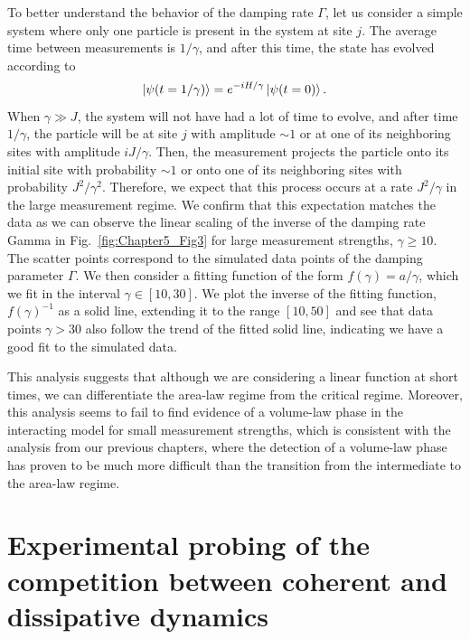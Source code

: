 To better understand the behavior of the damping rate $\Gamma$, let us consider a simple system where only one particle is present in the system at site $j$. The average time between measurements is $1/\gamma$, and after this time, the state has evolved according to 
\begin{equation}
    \ket{\psi(t = 1/\gamma)} = e^{-i H / \gamma} \ket{\psi(t=0)}.
\end{equation}
When $\gamma \gg J$, the system will not have had a lot of time to evolve, and after time $1/\gamma$, the particle will be at site $j$ with amplitude $\sim 1$ or at one of its neighboring sites with amplitude $i J/\gamma$. Then, the measurement projects the particle onto its initial site with probability $\sim 1$ or onto one of its neighboring sites with probability $J^2/\gamma^2$. Therefore, we expect that this process occurs at a rate $J^2 / \gamma$ in the large measurement regime. We confirm that this expectation matches the data as we can observe the linear scaling of the inverse of the damping rate Gamma in Fig.~\ref{fig:Chapter5_Fig3} for large measurement strengths, $\gamma \geq 10$. The scatter points correspond to the simulated data points of the damping parameter $\Gamma$. We then consider a fitting function of the form $f(\gamma) = a/\gamma$, which we fit in the interval $\gamma \in [10, 30]$. We plot the inverse of the fitting function, $f(\gamma)^{-1}$ as a solid line, extending it to the range $[10, 50]$ and see that data points $\gamma > 30$ also follow the trend of the fitted solid line, indicating we have a good fit to the simulated data. 

This analysis suggests that although we are considering a linear function at short times, we can differentiate the area-law regime from the critical regime. Moreover, this analysis seems to fail to find evidence of a volume-law phase in the interacting model for small measurement strengths, which is consistent with the analysis from our previous chapters, where the detection of a volume-law phase has proven to be much more difficult than the transition from the intermediate to the area-law regime. 

\section{Experimental probing of the competition between coherent and dissipative dynamics}

